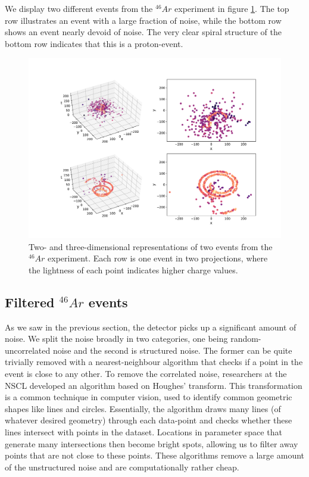 We display two different events from the ${}^{46}Ar$ experiment in figure \ref{fig:samples}. The top row illustrates an event with a large fraction of noise, while the bottom row shows an event nearly devoid of noise. The very clear spiral structure of the bottom row indicates that this is a proton-event.

\begin{figure}[H]
\centering
\includegraphics[width=\textwidth]{../plots/display_eventsfull_.pdf}
\caption[Displaying un-filtered events in 2D and 3D]{Two- and three-dimensional representations of two events from the ${}^{46}Ar$ experiment. Each row is one event in two projections, where the lightness of each point indicates higher charge values.}\label{fig:samples}
\end{figure}

\subsection{Filtered \texorpdfstring{${}^{46}Ar$}{46Ar} events}\label{sec:filtered}

As we saw in the previous section, the detector picks up a significant amount of noise. We split the noise broadly in two categories,  one being random-uncorrelated noise and the second is structured noise. The former can be quite trivially removed with a nearest-neighbour algorithm that checks if a point in the event is close to any other. To remove the correlated noise, researchers at the NSCL developed an algorithm based on Houghes' transform. This transformation is a common technique in computer vision, used to identify common geometric shapes like lines and circles. Essentially, the algorithm draws many lines (of whatever desired geometry) through each data-point and checks whether these lines intersect with points in the dataset. Locations in parameter space that generate many intersections then become bright spots, allowing us to filter away points that are not close to these points. These algorithms remove a large amount of the unstructured noise and are computationally rather cheap.

